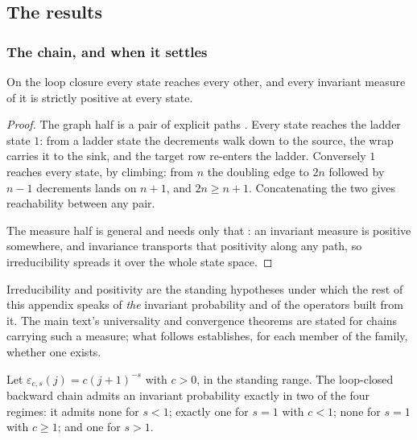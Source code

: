 \subsection{The results}\label{sec:doubling_results}


\subsubsection{The chain, and when it settles}


\begin{theorem}
  \label{thm:main_irreducible}
  \leanok
On the loop closure every state reaches every other, and every invariant measure of it is
strictly positive at every state.
\end{theorem}

\begin{proof}
  \leanok
The graph half is a pair of explicit paths . Every state
reaches the ladder state $1$: from a ladder state the decrements walk down to the source, the
wrap carries it to the sink, and the target row re-enters the ladder. Conversely $1$ reaches
every state, by climbing: from $n$ the doubling edge to $2n$ followed by $n-1$ decrements lands
on $n+1$, and $2n\geq n+1$. Concatenating the two gives reachability between any pair.

The measure half is general and needs only that :
an invariant measure is positive somewhere, and invariance transports that positivity along any
path, so irreducibility spreads it over the whole state space.
\end{proof}

\noindent Irreducibility and positivity are the standing hypotheses under which the rest of this appendix
speaks of \emph{the} invariant probability and of the operators built from it. The main text's
universality and convergence theorems are stated for chains carrying such a measure; what
follows establishes, for each member of the family, whether one exists.


\begin{theorem}
  \label{thm:main_phase}
  \leanok
Let $\varepsilon_{c,s}(j)=c(j+1)^{-s}$ with $c>0$, in the standing range. The loop-closed
backward chain admits an invariant probability exactly in two of the four regimes: it admits
none for $s<1$; exactly one for $s=1$ with $c<1$; none for $s=1$ with $c\geq1$; and one for
$s>1$.
\end{theorem}

